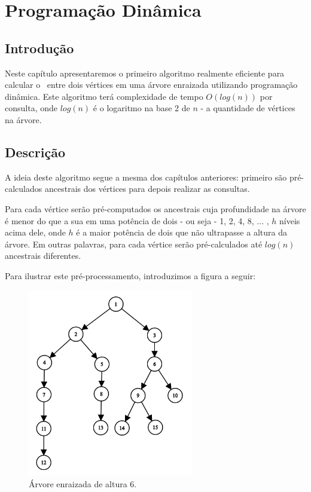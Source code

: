 \chapter{Programação Dinâmica}
\label{cap:programacao-dinamica}

\section{Introdução}

Neste capítulo apresentaremos o primeiro algoritmo realmente eficiente para calcular o \LCA\ entre dois vértices em uma árvore enraizada utilizando programação dinâmica. Este algoritmo terá complexidade de tempo $O(log(n))$ por consulta, onde $log(n)$ é o logaritmo na base 2 de $n$ - a quantidade de vértices na árvore.

\section{Descrição}

A ideia deste algoritmo segue a mesma dos capítulos anteriores: primeiro são pré-calculados ancestrais dos vértices para depois realizar as consultas.

Para cada vértice serão pré-computados os ancestrais cuja profundidade na árvore é menor do que a sua em uma potência de dois - ou seja - 1, 2, 4, 8, ... , $h$ níveis acima dele, onde $h$ é a maior potência de dois que não ultrapasse a altura da árvore. Em outras palavras, para cada vértice serão pré-calculados até $log(n)$ ancestrais diferentes.

Para ilustrar este pré-processamento, introduzimos a figura a seguir:

\begin{figure}[htb]
\begin{center}
\includegraphics[width=7.2cm]{images/graph_dp.png}
\end{center}
\caption{\label{fig:arvore-6}Árvore enraizada de altura 6.}
\end{figure}

